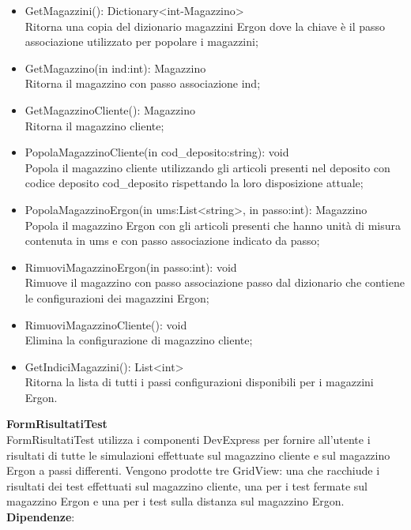 \begin{itemize}
    \item GetMagazzini(): Dictionary<int-Magazzino>\\
    Ritorna una copia del dizionario magazzini Ergon dove la chiave è il passo associazione utilizzato per popolare i magazzini;
    \item GetMagazzino(in ind:int): Magazzino \\
    Ritorna il magazzino con passo associazione ind;
    \item GetMagazzinoCliente(): Magazzino \\
    Ritorna il magazzino cliente;
    \item PopolaMagazzinoCliente(in cod\_deposito:string): void \\
    Popola il magazzino cliente utilizzando gli articoli presenti nel deposito con codice deposito cod\_deposito rispettando la loro disposizione attuale;
    \item PopolaMagazzinoErgon(in ums:List<string>, in passo:int): Magazzino \\
    Popola il magazzino Ergon con gli articoli presenti che hanno unità di misura contenuta in ums e con passo associazione indicato da passo;
    \item RimuoviMagazzinoErgon(in passo:int): void \\
    Rimuove il magazzino con passo associazione passo dal dizionario che contiene le configurazioni dei magazzini Ergon;
    \item RimuoviMagazzinoCliente(): void \\
    Elimina la configurazione di magazzino cliente;
    \item GetIndiciMagazzini(): List<int> \\
    Ritorna la lista di tutti i passi configurazioni disponibili per i magazzini Ergon.
\end{itemize} 
\textbf{FormRisultatiTest}\\
FormRisultatiTest utilizza i componenti DevExpress per fornire all'utente i risultati di tutte le simulazioni effettuate
sul magazzino cliente e sul magazzino Ergon a passi differenti.
Vengono prodotte tre GridView: una che racchiude i risultati dei test effettuati sul magazzino cliente, una per i test fermate sul magazzino 
Ergon e una per i test sulla distanza sul magazzino Ergon.
\textbf{Dipendenze}:
